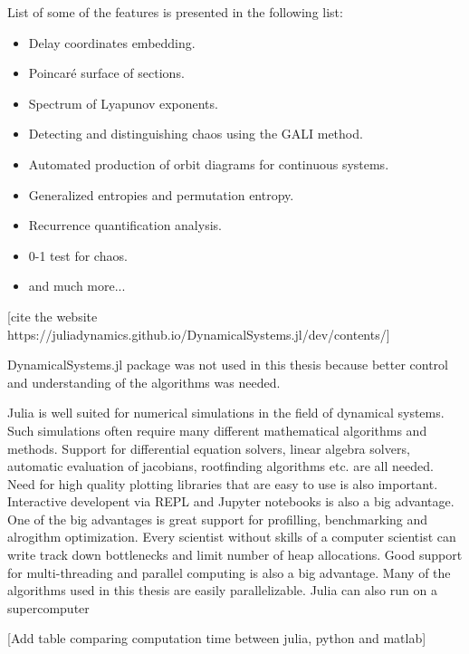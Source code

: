 List of some of the features is presented in the following list:
\begin{itemize}
    \item Delay coordinates embedding.
    \item Poincaré surface of sections.
    \item Spectrum of Lyapunov exponents.
    \item Detecting and distinguishing chaos using the GALI method.
    \item Automated production of orbit diagrams for continuous systems.
    \item Generalized entropies and permutation entropy.
    \item Recurrence quantification analysis.
    \item 0-1 test for chaos.
    \item and much more...
\end{itemize} [cite the website https://juliadynamics.github.io/DynamicalSystems.jl/dev/contents/]

DynamicalSystems.jl package was not used in this thesis because better control and understanding of the algorithms was needed.
\par
Julia is well suited for numerical simulations in the field of dynamical systems.
Such simulations often require many different mathematical algorithms and methods.
Support for differential equation solvers, linear algebra solvers, automatic evaluation of jacobians, rootfinding algorithms etc. are all needed.
Need for high quality plotting libraries that are easy to use is also important.
Interactive developent via REPL and Jupyter notebooks is also a big advantage.
One of the big advantages is great support for profilling, benchmarking and alrogithm optimization.
Every scientist without skills of a computer scientist can write track down bottlenecks and limit number of heap allocations.
Good support for multi-threading and parallel computing is also a big advantage.
Many of the algorithms used in this thesis are easily parallelizable.
Julia can also run on a supercomputer~\cite{Regier2016-vq}

[Add table comparing computation time between julia, python and matlab]

